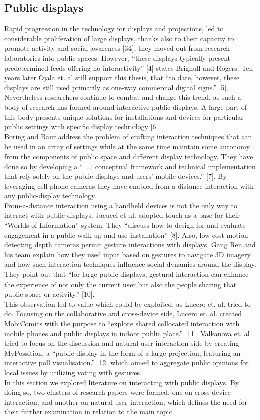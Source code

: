 \subsection{Public displays}
Rapid progression in the technology for displays and projections, led to considerable proliferation of large displays, thanks also to their capacity to promote activity and social awareness [34], they moved out from research laboratories into public spaces. However, “these displays typically present predetermined feeds offering no interactivity” [4] states Brignull and Rogers. Ten years later Ojala et. al still support this thesis, that “to date, however, these displays are still used primarily as one-way commercial digital signs.” [5]. \\

Nevertheless researchers continue to combat and change this trend, as such a body of research has formed around interactive public displays. A large part of this body presents unique  solutions for installations and devices for particular public settings with specific display technology [6].\\

Boring and Baur address the problem of crafting interaction techniques that can be used in an array of settings while at the same time maintain some autonomy from the components of public space and different display technology. They have done so by developing a “[...] conceptual framework and technical implementation that rely solely on the public displays and users’ mobile devices.” [7]. By  leveraging cell phone cameras they have enabled from-a-distance interaction with any public-display technology.\\

From-a-distance interaction using a handheld devices is not the only way to interact with public displays. Jacucci et al. adopted touch as a base for their “Worlds of Information” system. They “discuss how to design for and evaluate engagement in a public walk-up-and-use installation” [8]. Also, low-cost motion detecting depth cameras permit gesture interactions with displays. Gang Ren and his team explain how they used input based on gestures to navigate 3D imagery and how such interaction techniques influence social dynamics around the display. They point out that “for large public displays, gestural interaction can enhance the experience of not only the current user but also the people sharing that public space or activity.” [10].
\\
This observation led to value which could be exploited, as Lucero et. al. tried to do. Focusing on the collaborative and cross-device side, Lucero et. al. created MobiComics with the purpose to “explore shared collocated interaction with mobile phones and public displays in indoor public place.” [11]. Valkanova et. al tried to focus on the discussion and natural user interaction side by creating MyPossition, a “public display in the form of a large projection, featuring an interactive poll visualisation.” [12] which aimed to aggregate public opinions for local issues by utilizing voting with gestures.\\

In this section we explored literature on interacting with public displays. By doing so, two clusters of research papers were formed, one on cross-device interaction, and another on natural user interaction, which defines the need for their further examination in relation to the main topic.
